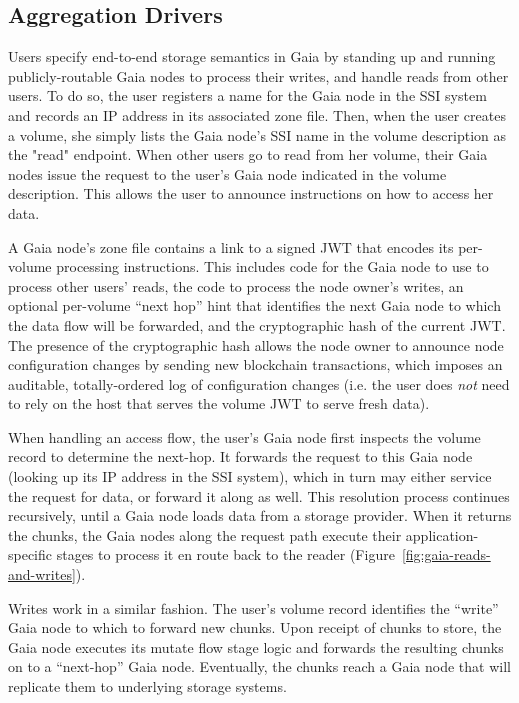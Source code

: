 \subsection{Aggregation Drivers}

Users specify end-to-end storage semantics in Gaia by standing up and running
publicly-routable Gaia nodes to process their writes, and handle reads from
other users.  To do so, the user registers a name for the Gaia node in the SSI
system and records an IP address in its associated zone file.
Then, when the user creates a volume, she simply lists the Gaia node's SSI name
in the volume description as the "read" endpoint.  When other users go to
read from her volume, their Gaia nodes issue the request to the user's Gaia node
indicated in the volume description.  This allows the user to announce
instructions on how to access her data.

A Gaia node's zone file contains a link to a signed
JWT that encodes its per-volume processing instructions.
This includes code for the Gaia node to use to process other
users' reads, the code to process the node owner's writes, an optional
per-volume ``next hop'' hint that identifies the next Gaia node to which the data flow will be
forwarded, and the cryptographic hash of the
current JWT.  The presence of the cryptographic hash 
allows the node owner to announce node configuration changes
by sending new blockchain transactions, which imposes an auditable,
totally-ordered log of configuration changes (i.e. the user does \emph{not} need to
rely on the host that serves the volume JWT to serve fresh data).


When handling an access flow, the user's Gaia node first inspects the volume
record to determine the next-hop.  It
forwards the request to this Gaia node (looking up its IP address in the SSI
system), which in turn may either service the request for data, or forward it
along as well.  This resolution process continues recursively, until a Gaia node
loads data from a storage provider.  When it returns the chunks, the Gaia nodes
along the request path execute their application-specific stages to process it
en route back to the reader (Figure~\ref{fig:gaia-reads-and-writes}).

Writes work in a similar fashion.  The user's volume record identifies the
``write'' Gaia node to which to forward new chunks.  Upon receipt of chunks to
store, the Gaia node executes its mutate flow stage logic and forwards the
resulting chunks on to a ``next-hop'' Gaia node.  Eventually, the chunks reach a Gaia
node that will replicate them to underlying storage systems.

